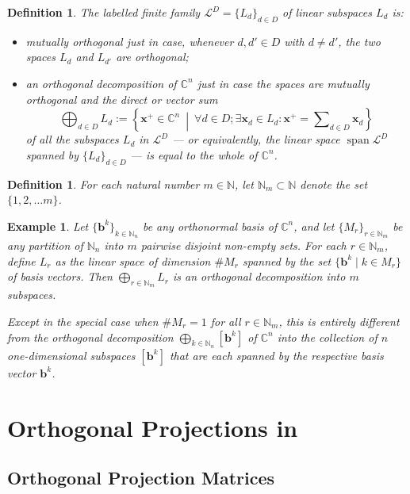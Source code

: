 \documentclass[11pt]{article}
\newcommand \N { \mathbb{N} }
\newcommand \C { \mathbb{C} }
\DeclareMathOperator{\spn}{{span}}
\newtheorem{definition}[theorem]{Definition}
\newtheorem{example}[theorem]{Example}
\begin{document}
\begin{definition}
	The labelled finite family $ \mathcal L^D = \{ L_d \} _{d \in D} $
	of linear subspaces $ L_d $ is:
	\begin{itemize}
		\item \emph{mutually orthogonal} just in case, whenever $d, d' \in D$ with $d \ne d'$,
		 the two spaces $ L_d $ and $ L_{d'} $ are orthogonal;
		\item an \emph{orthogonal decomposition} of $ \C^n $
	just in case the spaces are mutually orthogonal
	and the \emph{direct} or \emph{vector} sum 
 \[ \bigoplus\nolimits _{d \in D} L_d 
    := \left \{ \mathbf x^+ \in \C^n \ \middle \vert \ \forall d \in D; 
	\exists \mathbf x_d \in L_d : 
	\mathbf x^+ = \sum\nolimits _{d \in D} \mathbf x_d \right \} \]
	of all the subspaces $ L_d $ in $ \mathcal L^D $ 
	--- or equivalently, the linear space $ \spn \mathcal L^D $ 
	spanned by $ \{ L_d \} _{d \in D} $	--- is equal to the whole of $ \C^n $.
	\end{itemize}
\end{definition}

\begin{definition}
	For each natural number $m \in \N$, 
	let $ \N_m \subset \N $ denote the set $ \{ 1, 2, \ldots m \}$.
\end{definition}

\begin{example}
	Let $ \{ \mathbf b^k \}_{k \in \N_n } $ be any orthonormal basis of $ \C^n $,
	and let $ \{ M_r \}_{r \in \N_m }$ be any partition of $ \N_n $
	into $m$ pairwise disjoint non-empty sets.
	For each $r \in \N_m $, define $ L_r $ as the linear space of dimension $ \# M_r $
	spanned by the set $ \{ \mathbf b^k \mid k \in M_r \}$ of basis vectors.
	Then $ \bigoplus _{r \in \N_m } L_r $ is an orthogonal decomposition into $m$ subspaces.

	Except in the special case when $ \# M_r = 1$ for all $r \in \N_m $,
	this is entirely different
	from the orthogonal decomposition $ \bigoplus _{k \in \N_n } [ \mathbf b^k ]$
	of $ \C^n $ into the collection of $n$ one-dimensional subspaces $[ \mathbf b^k ]$
	that are each spanned by the respective basis vector $ \mathbf b^k $.
\end{example}

\section{Orthogonal Projections in \protect{$ \C^n $}} \label{s:orthProj}
\subsection{Orthogonal Projection Matrices}
\end{document}
